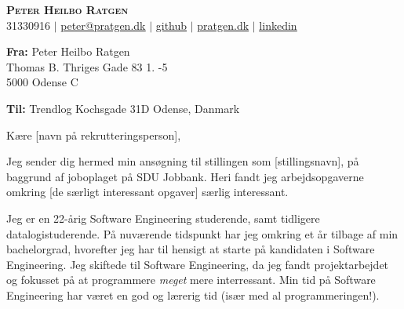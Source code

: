 \documentclass{article}
\begin{document}
\begin{center}
  \textbf{\huge{\scshape{Peter Heilbo Ratgen}}}\\ 
  \vspace{0.2cm}
  \small 31330916 $|$
  \href{mailto:peter@pratgen.dk}{\underline{peter@pratgen.dk}} $|$
  \href{https://github.com/PeterRatgen }{\underline{github}} $|$
  \href{https://pratgen.dk}{\underline{pratgen.dk}} $|$
  \href{https://www.linkedin.com/in/peter-ratgen-a1236529/}{\underline{linkedin}}
\end{center}
\vspace{0.25cm}
\begin{flushright}
\begin{minipage}{.45\linewidth}
    \begin{flushleft}
    \textbf{Fra: }\newline
    Peter Heilbo Ratgen \\
    Thomas B. Thriges Gade 83 1. -5 \\
    5000 Odense C
    \end{flushleft}
\end{minipage}
\end{flushright}
\begin{flushleft}
\textbf{Til:}\newline
Trendlog\newline
Kochsgade 31D  Odense, Danmark 
\end{flushleft}
\vspace{0.5cm}

Kære [navn på rekrutteringsperson], \vspace{\baselineskip}

Jeg sender dig hermed min ansøgning til stillingen som [stillingsnavn], på
baggrund af joboplaget på SDU Jobbank.  Heri fandt jeg arbejdsopgaverne
omkring [de særligt interessant opgaver] særlig interessant. \vspace{\baselineskip}

Jeg er en 22-årig Software Engineering studerende, samt tidligere
datalogistuderende. På nuværende tidspunkt har jeg omkring et år tilbage
af min bachelorgrad, hvorefter jeg har til hensigt at starte på kandidaten i
Software Engineering. Jeg skiftede til Software Engineering, da jeg fandt
projektarbejdet og fokusset på at programmere \textit{meget} mere interressant.
Min tid på Software Engineering har været en god og lærerig tid (især med al
programmeringen!).\vspace{\baselineskip}
\end{document}
